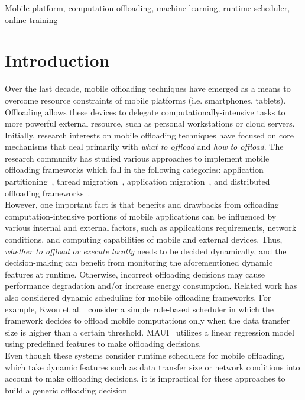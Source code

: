 \documentclass[10pt, conference, compsocconf]{IEEEtran}
\begin{document}
\begin{IEEEkeywords}
Mobile platform, computation offloading, machine learning, runtime
scheduler, online training
\end{IEEEkeywords}

\section{Introduction}
%
Over the last decade, mobile offloading techniques have emerged as
a means to overcome resource constraints of mobile platforms (i.e.
smartphones, tablets).
%
Offloading allows these devices to delegate computationally-intensive
tasks to more powerful external resource, such as personal workstations
or cloud servers.
%
Initially, research interests on mobile offloading techniques
have focused on core mechanisms that deal primarily with \textit{what to
offload} and \textit{how to offload}.
%
The research community has studied various approaches to implement mobile
offloading frameworks which fall in the following categories:
application partitioning~\cite{maui, cuckoo}, thread
migration~\cite{clonecloud, comet}, application migration~\cite{hung},
and distributed offloading frameworks~\cite{serendipity}.\\
%
\indent However, one important fact is that benefits and drawbacks
from offloading computation-intensive portions of mobile applications
can be influenced by various internal and external factors, such as
applications requirements, network conditions, and computing
capabilities of mobile and external devices. 
%
Thus, \textit{whether to offload or execute locally} needs to be
decided dynamically, and the decision-making can benefit from monitoring
the aforementioned dynamic features at runtime.
%
Otherwise, incorrect offloading decisions may cause performance
degradation and/or increase energy consumption.
%
Related work has also considered dynamic scheduling for mobile
offloading frameworks.
%
For example, Kwon et al.~\cite{kwon} consider a simple rule-based
scheduler in which the framework decides to offload  mobile
computations only when the data transfer size is higher than a certain
threshold.
%
MAUI~\cite{maui} utilizes a linear regression model using predefined
features to make offloading decisions.\\
%
\indent Even though these systems consider runtime schedulers for mobile
offloading, which take dynamic features such as data transfer size or
network conditions into account to make offloading decisions, it is
impractical for these approaches to build a generic offloading decision
\end{document}

